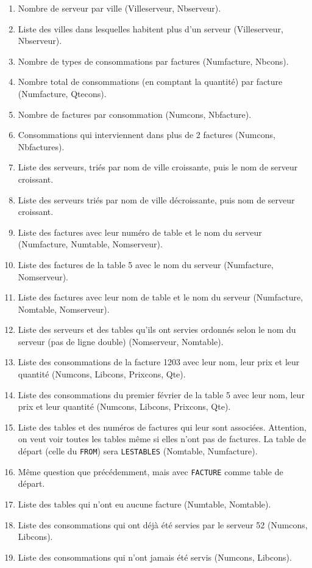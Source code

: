 \documentclass{report}
\begin{document}
\begin{enumerate}
	\item Nombre de serveur par ville (Villeserveur, Nbserveur).
	\item Liste des villes dans lesquelles habitent plus d'un serveur (Villeserveur, Nbserveur).
	\item Nombre de types de consommations par factures (Numfacture, Nbcons).
	\item Nombre total de consommations (en comptant la quantité) par facture (Numfacture, Qtecons).
	\item Nombre de factures par consommation (Numcons, Nbfacture).
	\item Consommations qui interviennent dans plus de 2 factures (Numcons, Nbfactures).
	\item Liste des serveurs, triés par nom de ville croissante, puis le nom de serveur croissant.
	\item Liste des serveurs triés par nom de ville décroissante, puis nom de serveur croissant.
	\item Liste des factures avec leur numéro de table et le nom du serveur (Numfacture, Numtable, Nomserveur).
	\item Liste des factures de la table 5 avec le nom du serveur (Numfacture, Nomserveur).
	\item Liste des factures avec leur nom de table et le nom du serveur (Numfacture, Nomtable, Nomserveur).
	\item Liste des serveurs et des tables qu'ils ont servies ordonnés selon le nom du serveur (pas de ligne double) (Nomserveur, Nomtable).
	\item Liste des consommations de la facture 1203 avec leur nom, leur prix et leur quantité (Numcons, Libcons, Prixcons, Qte).
	\item Liste des consommations du premier février de la table 5 avec leur nom, leur prix et leur quantité (Numcons, Libcons, Prixcons, Qte).
	\item Liste des tables et des numéros de factures qui leur sont associées. Attention, on veut voir toutes les tables même si elles n'ont pas de factures. La table de départ (celle du \verb+FROM+) sera \verb+LESTABLES+ (Nomtable, Numfacture).
	\item Même question que précédemment, mais avec \verb+FACTURE+ comme table de départ.
	\item Liste des tables qui n'ont eu aucune facture (Numtable, Nomtable).
	\item Liste des consommations qui ont déjà été servies par le serveur 52 (Numcons, Libcons).
	\item Liste des consommations qui n'ont jamais été servis (Numcons, Libcons).

\end{enumerate}
\end{document}
